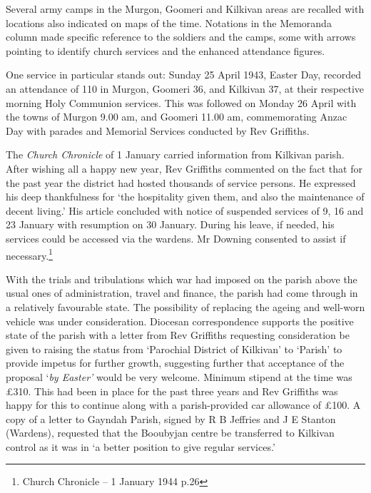 Several army camps in the Murgon, Goomeri and Kilkivan areas are recalled with locations also indicated on maps of the time. Notations in the Memoranda column made specific reference to the soldiers and the camps, some with arrows pointing to identify church services and the enhanced attendance figures.

One service in particular stands out: Sunday 25 April 1943, Easter Day, recorded an attendance of 110 in Murgon, Goomeri 36, and Kilkivan 37, at their respective morning Holy Communion services. This was followed on Monday 26 April with the towns of Murgon 9.00 am, and Goomeri 11.00 am, commemorating Anzac Day with parades and Memorial Services conducted by Rev Griffiths.

The \emph{Church Chronicle} of 1 January carried information from Kilkivan parish. After wishing all a happy new year, Rev Griffiths commented on the fact that for the past year the district had hosted thousands of service persons. He expressed his deep thankfulness for `the hospitality given them, and also the maintenance of decent living.' His article concluded with notice of suspended services of 9, 16 and 23 January with resumption on 30 January. During his leave, if needed, his services could be accessed via the wardens. Mr Downing consented to assist if necessary.\footnote{Church Chronicle -- 1 January 1944 p.26}

With the trials and tribulations which war had imposed on the parish above the usual ones of administration, travel and finance, the parish had come through in a relatively favourable state. The possibility of replacing the ageing and well-worn vehicle was under consideration. Diocesan correspondence supports the positive state of the parish with a letter from Rev Griffiths requesting consideration be given to raising the status from `Parochial District of Kilkivan' to `Parish' to provide impetus for further growth, suggesting further that acceptance of the proposal `\emph{by Easter'} would be very welcome. Minimum stipend at the time was £310. This had been in place for the past three years and Rev Griffiths was happy for this to continue along with a parish-provided car allowance of £100. A copy of a letter to Gayndah Parish, signed by R B Jeffries and J E Stanton (Wardens), requested that the Booubyjan centre be transferred to Kilkivan control as it was in `a better position to give regular services.'

